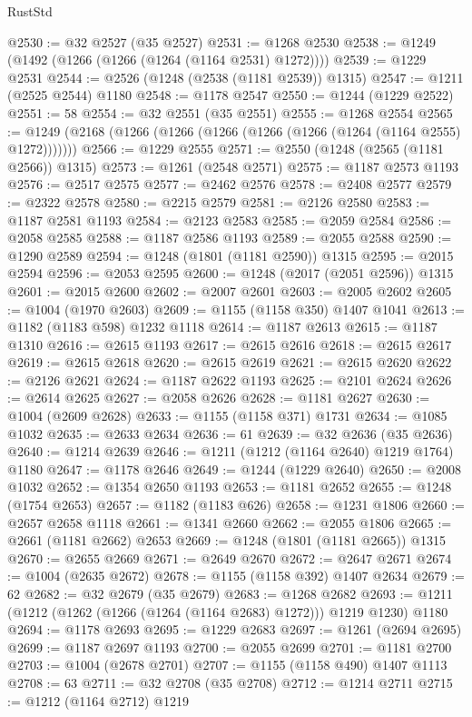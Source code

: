 \begin{lexlean}{RustStd}
\begin{coremodule}
@2530 := @32 @2527 (@35 @2527)
@2531 := @1268 @2530
@2538 := @1249 (@1492 (@1266 (@1266 (@1264 (@1164 @2531) @1272))))
@2539 := @1229 @2531
@2544 := @2526 (@1248 (@2538 (@1181 @2539)) @1315)
@2547 := @1211 (@2525 @2544) @1180
@2548 := @1178 @2547
@2550 := @1244 (@1229 @2522)
@2551 := 58
@2554 := @32 @2551 (@35 @2551)
@2555 := @1268 @2554
@2565 := @1249 (@2168 (@1266 (@1266 (@1266 (@1266 (@1266 (@1264 (@1164 @2555) @1272)))))))
@2566 := @1229 @2555
@2571 := @2550 (@1248 (@2565 (@1181 @2566)) @1315)
@2573 := @1261 (@2548 @2571)
@2575 := @1187 @2573 @1193
@2576 := @2517 @2575
@2577 := @2462 @2576
@2578 := @2408 @2577
@2579 := @2322 @2578
@2580 := @2215 @2579
@2581 := @2126 @2580
@2583 := @1187 @2581 @1193
@2584 := @2123 @2583
@2585 := @2059 @2584
@2586 := @2058 @2585
@2588 := @1187 @2586 @1193
@2589 := @2055 @2588
@2590 := @1290 @2589
@2594 := @1248 (@1801 (@1181 @2590)) @1315
@2595 := @2015 @2594
@2596 := @2053 @2595
@2600 := @1248 (@2017 (@2051 @2596)) @1315
@2601 := @2015 @2600
@2602 := @2007 @2601
@2603 := @2005 @2602
@2605 := @1004 (@1970 @2603)
@2609 := @1155 (@1158 @350) @1407 @1041
@2613 := @1182 (@1183 @598) @1232 @1118
@2614 := @1187 @2613
@2615 := @1187 @1310
@2616 := @2615 @1193
@2617 := @2615 @2616
@2618 := @2615 @2617
@2619 := @2615 @2618
@2620 := @2615 @2619
@2621 := @2615 @2620
@2622 := @2126 @2621
@2624 := @1187 @2622 @1193
@2625 := @2101 @2624
@2626 := @2614 @2625
@2627 := @2058 @2626
@2628 := @1181 @2627
@2630 := @1004 (@2609 @2628)
@2633 := @1155 (@1158 @371) @1731
@2634 := @1085 @1032
@2635 := @2633 @2634
@2636 := 61
@2639 := @32 @2636 (@35 @2636)
@2640 := @1214 @2639
@2646 := @1211 (@1212 (@1164 @2640) @1219 @1764) @1180
@2647 := @1178 @2646
@2649 := @1244 (@1229 @2640)
@2650 := @2008 @1032
@2652 := @1354 @2650 @1193
@2653 := @1181 @2652
@2655 := @1248 (@1754 @2653)
@2657 := @1182 (@1183 @626)
@2658 := @1231 @1806
@2660 := @2657 @2658 @1118
@2661 := @1341 @2660
@2662 := @2055 @1806
@2665 := @2661 (@1181 @2662) @2653
@2669 := @1248 (@1801 (@1181 @2665)) @1315
@2670 := @2655 @2669
@2671 := @2649 @2670
@2672 := @2647 @2671
@2674 := @1004 (@2635 @2672)
@2678 := @1155 (@1158 @392) @1407 @2634
@2679 := 62
@2682 := @32 @2679 (@35 @2679)
@2683 := @1268 @2682
@2693 := @1211 (@1212 (@1262 (@1266 (@1264 (@1164 @2683) @1272))) @1219 @1230) @1180
@2694 := @1178 @2693
@2695 := @1229 @2683
@2697 := @1261 (@2694 @2695)
@2699 := @1187 @2697 @1193
@2700 := @2055 @2699
@2701 := @1181 @2700
@2703 := @1004 (@2678 @2701)
@2707 := @1155 (@1158 @490) @1407 @1113
@2708 := 63
@2711 := @32 @2708 (@35 @2708)
@2712 := @1214 @2711
@2715 := @1212 (@1164 @2712) @1219

\end{coremodule}
\end{lexlean}
